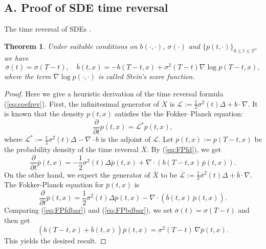 \documentclass[letterpaper,10pt,reqno]{amsart}
\def\eqref#1{(\ref{#1})}
\newtheorem{theorem}{Theorem}
\numberwithin{equation}{section}
\begin{document}
\subsection*{A. Proof of SDE time reversal}

The time reversal of SDEs \cite{Ander82, HP86}.
\begin{theorem}
\label{thm:SDErev}
Under suitable conditions on $b(\cdot, \cdot)$, $\sigma(\cdot)$ and $\{p(t, \cdot)\}_{0 \le t \le T}$, 
we have
\begin{equation}
\label{eq:coefrev}
\overline{\sigma}(t) = \sigma(T-t), \quad
\overline{b}(t,x) = -b(T-t, x) + \sigma^2(T-t)  \nabla \log p (T-t,x),
\end{equation}
where the term $\nabla \log p(\cdot, \cdot)$ is called Stein's score function.
\end{theorem}

\begin{proof}
Here we give a heuristic derivation of the time reversal formula \eqref{eq:coefrev}.
First, the infinitesimal generator of $X$ is 
$\mathcal{L}:= \frac{1}{2} \sigma^2(t) \Delta  +b \cdot \nabla$.
It is known that the density $p(t,x)$ satisfies the the Fokker–Planck equation:
\begin{equation}
\label{eq:FPfd}
\frac{\partial}{\partial t} p(t,x) = \mathcal{L}^*p(t,x),
\end{equation}
where $\mathcal{L}^*:= \frac{1}{2} \sigma^2(t) \Delta - \nabla \cdot b$ is the adjoint of $\mathcal{L}$.
Let $\overline{p}(t,x) := p(T-t, x)$ be the probability density of the time reversal $\overline{X}$. 
By \eqref{eq:FPfd}, we get
\begin{equation}
\label{eq:FPfdbar}
\frac{\partial}{\partial t} \overline{p}(t,x) = -\frac{1}{2} \sigma^2 (t) \Delta \overline{p}(t,x)  + \nabla \cdot \left(b(T-t, x) \, \overline{p}(t,x) \right).
\end{equation}
On the other hand, we expect the generator of $\overline{X}$ to be 
$\overline{\mathcal{L}}:=  \frac{1}{2} \overline{\sigma}^2(t)  \Delta + \overline{b} \cdot \nabla$.
The Fokker-Planck equation for $\overline{p}(t,x)$ is
\begin{equation}
\label{eq:FPbdbar}
\frac{\partial}{\partial t} \overline{p}(t,x) = \frac{1}{2}  \overline{\sigma}^2(t) \Delta \overline{p}(t,x)- \nabla \cdot \left(\overline{b}(t, x) \, \overline{p}(t,x) \right).
\end{equation}
Comparing \eqref{eq:FPfdbar} and \eqref{eq:FPbdbar},
we set $\overline{\sigma}(t) = \sigma(T-t)$ and then get
\begin{equation*}
\left(b(T-t,x) + \overline{b}(t,x)\right) \overline{p}(t,x) = \sigma^2(T-t) \, \nabla \overline{p}(t,x).
\end{equation*}
This yields the desired result. 
\end{proof}
\end{document}
